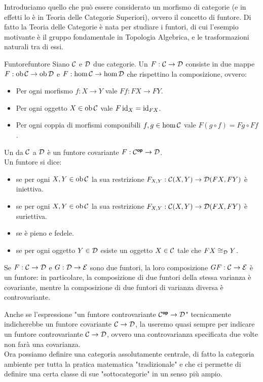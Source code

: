 \documentclass[openany]{book}
\renewcommand\C{\mc{C}}
\newcommand\D{\mc{D}}
\begin{document}
Introduciamo quello che può essere considerato un morfismo di categorie (e in effetti lo è in Teoria delle Categorie Superiori), ovvero il concetto di funtore. Di fatto la Teoria delle Categorie è nata per studiare i funtori, di cui l'esempio motivante è il gruppo fondamentale in Topologia Algebrica, e le trasformazioni naturali tra di essi.

\begin{definition}{Funtore}{funtore}
    Siano $\C$ e $\D$ due categorie. Un  $F: \C\to\D$ consiste in due mappe $F:\ob\C\to\ob\D$ e $F:\hom\C\to\hom\D$ che rispettino la composizione, ovvero:\begin{itemize}
        \item Per ogni morfismo $f :X\to Y$ vale $Ff: FX \to FY$.
        \item Per ogni oggetto $X \in \ob\C$ vale $F\operatorname{id}_X = \operatorname{id}_{FX}$.
        \item Per ogni coppia di morfismi componibili $f,g \in \hom\C$ vale $F(g\circ f) = Fg\circ Ff$.
    \end{itemize}
    Un  da $\C$ a $\D$ è un funtore covariante $F: \C^\op\to\D$.\\
    Un funtore si dice:\begin{itemize}
        \item {} se per ogni $X,Y \in \ob\C$ la sua restrizione $F_{X,Y}:\C(X,Y)\to \D(FX,FY)$ è iniettiva.
        \item {} se per ogni $X,Y \in \ob\C$ la sua restrizione $F_{X,Y}:\C(X,Y)\to \D(FX,FY)$ è suriettiva.
        \item {} se è pieno e fedele.
        \item {} se per ogni oggetto $Y \in \D$ esiste un oggetto $X \in \C$ tale che $FX\cong_\D Y$.
    \end{itemize}
    Se $F:\C\to\D$ e $G:\D\to\mc{E}$ sono due funtori, la loro composizione $GF : \C\to\mc{E}$ è un funtore: in particolare, la composizione di due funtori della stessa varianza è covariante, mentre la composizione di due funtori di varianza diversa è controvariante.
\end{definition}

Anche se l'espressione "un funtore controvariante $\C^\op\to\D$" tecnicamente indicherebbe un funtore covariante $\C\to\D$, la useremo quasi sempre per indicare un funtore controvariante $\C\to\D$, ovvero una controvarianza specificata due volte non farà una covarianza.\\
Ora possiamo definire una categoria assolutamente centrale, di fatto la categoria ambiente per tutta la pratica matematica "tradizionale" e che ci permette di definire una certa classe di sue "sottocategorie" in un senso più ampio.
\end{document}
